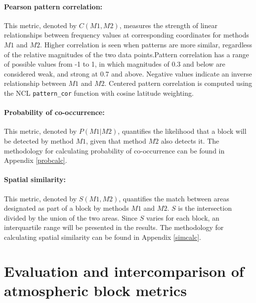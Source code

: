 \documentclass[smallextended]{svjour3}       %
\numberwithin{equation}{section}
\begin{document}
\paragraph{Pearson pattern correlation:} This metric, denoted by $C(M1,M2)$, measures the strength of linear relationships between  frequency values at corresponding coordinates for methods $M1$ and $M2$. Higher correlation is seen when patterns are more similar, regardless of the relative magnitudes of the two data points.Pattern correlation has a range of possible values from -1 to 1, in which magnitudes of 0.3 and below are considered weak, and strong at 0.7 and above. Negative values indicate an inverse relationship between $M1$ and $M2$. Centered pattern correlation is computed using the NCL \texttt{pattern\_cor} function with cosine latitude weighting. 

\paragraph{Probability of co-occurrence:} This metric, denoted by $P(M1|M2)$, quantifies the likelihood that a block will be detected by method $M1$, given that method $M2$ also detects it. The methodology for calculating probability of co-occurrence can be found in Appendix \ref{probcalc}. 

\paragraph{Spatial similarity:} This metric, denoted by $S(M1,M2)$, quantifies the match between areas designated as part of a block by methods $M1$ and $M2$. $S$ is the intersection divided by the union of the two areas. Since $S$ varies for each block, an interquartile range will be presented in the results. The methodology for calculating spatial similarity can be found in Appendix \ref{simcalc}. 

\section{Evaluation and intercomparison of atmospheric block metrics}\label{results}
\end{document}
